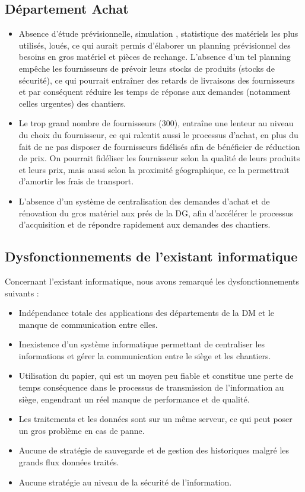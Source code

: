 		\subsection{Département Achat}
				\begin{itemize}
				    \item Absence d'étude prévisionnelle, simulation , statistique des matériels les plus utilisés, loués, ce qui aurait permis d'élaborer un planning prévisionnel des besoins en gros matériel et pièces de rechange. L'absence d'un tel planning empêche les fournisseurs de prévoir leurs stocks de produits (stocks de sécurité), ce qui pourrait entraîner des retards de livraisons des fournisseurs et par conséquent réduire les temps de réponse aux demandes (notamment celles urgentes) des chantiers.
						\item Le trop grand nombre de fournisseurs (300), entra\^ine une lenteur au niveau du choix du fournisseur, ce qui ralentit aussi le processus d'achat, en plus du fait de ne pas disposer de fournisseurs fidélisés afin de bénéficier de réduction de prix. On pourrait fidéliser les fournisseur selon la qualité de leurs produits et leurs prix, mais aussi selon la proximité géographique, ce la permettrait d'amortir les frais de transport.
						\item L'absence d'un système de centralisation des demandes d'achat et de rénovation du gros matériel aux prés de la DG, afin d'accélérer le processus d'acquisition et de répondre rapidement aux demandes des chantiers.
				\end{itemize}
	\subsection{Dysfonctionnements de l'existant informatique}
		Concernant l'existant informatique, nous avons remarqué les dysfonctionnements suivants :
		\begin{itemize}
				\item Indépendance totale des applications des départements de la DM et le manque de communication entre elles.
				\item Inexistence d'un système informatique permettant de centraliser les informations et gérer la communication entre le siège et les chantiers.
				\item Utilisation du papier, qui est un moyen peu fiable et constitue une perte de temps conséquence dans le processus de transmission de l'information au siège, engendrant un réel manque de performance et de qualité.
				\item Les traitements et les données sont sur un même serveur, ce qui peut poser un gros problème en cas de panne.
				\item Aucune de stratégie de sauvegarde et de gestion des historiques malgré les grands flux données traités.
				\item Aucune stratégie au niveau de la sécurité de l'information.
		\end{itemize}

